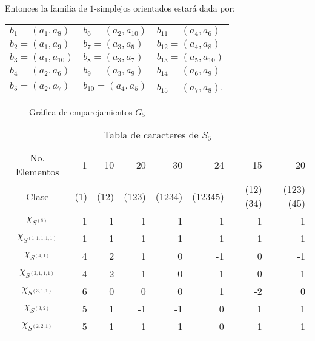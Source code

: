 \documentclass[12pt]{book}
\theoremstyle{definition}
\newcounter{in}
\begin{document}
Entonces la familia de $1$-simplejos orientados estará dada por:
\begin{center}
  \begin{tabular}[h]{lll}
    $b_{1}=(a_{1},a_{8})$ & $b_{6}=(a_{2},a_{10})$ & $b_{11}=(a_{4},a_{6})$  \\
    $b_{2}=(a_{1},a_{9})$ & $b_{7}=(a_{3},a_{5})$ & $b_{12}=(a_{4},a_{8})$  \\
    $b_{3}=(a_{1},a_{10})$ & $b_{8}=(a_{3},a_{7})$ & $b_{13}=(a_{5},a_{10})$  \\
    $b_{4}=(a_{2},a_{6})$ & $b_{9}=(a_{3},a_{9})$ & $b_{14}=(a_{6},a_{9})$  \\
    $b_{5}=(a_{2},a_{7})$ & $b_{10}=(a_{4},a_{5})$ & $b_{15}=(a_{7},a_{8})$.  
  \end{tabular}
\end{center}
\begin{figure}[!hbtp]
  \centering
  
  \caption{Gráfica de emparejamientos $G_{5}$}
  \label{fig:G_5}
\end{figure}
\begin{table}[!hbtp]
  \centering
  \begin{small}
    \begin{tabular}{c |r r r r r r r}
      No. Elementos& 1 & 10 & 20 & 30 & 24 & 15 & 20  \\
      Clase & (1) & (12) & (123) & (1234) & (12345) & (12)(34) & (123)(45) \\
      \hline
      $\chi_{S^{(5)}}$       & 1 & 1 & 1 & 1 & 1 & 1 & 1 \\
      $\chi_{S^{(1,1,1,1,1)}}$ & 1 & -1 & 1 & -1 & 1 & 1 & -1\\
      $\chi_{S^{(4,1)}}$      & 4 & 2 & 1 & 0 & -1 & 0 & -1\\
      $\chi_{S^{(2,1,1,1)}}$   & 4 & -2 & 1 & 0 & -1 & 0 & 1 \\
      $\chi_{S^{(3,1,1)}}$    & 6 & 0 & 0 & 0 & 1 & -2 & 0 \\
      $\chi_{S^{(3,2)}}$     & 5 & 1 & -1 & -1 & 0 & 1 & 1 \\
      $\chi_{S^{(2,2,1)}}$   & 5 & -1 & -1 & 1 & 0 & 1 & -1 
    \end{tabular}
  \end{small}

  \caption{Tabla de caracteres de $S_{5}$}
  \label{tab:S_5}
\end{table}
\end{document}
